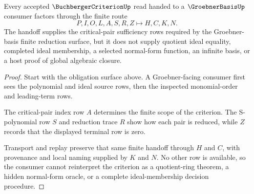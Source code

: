 \begin{theorem}
\label{thm:buchberger-criterion-groebner-handoff}
Every accepted $\BuchbergerCriterionUp$ read handed to a $\GroebnerBasisUp$ consumer factors through the finite route
$$
P,I,O,L,A,S,R,Z \longmapsto H,C,K,N .
$$
The handoff supplies the critical-pair sufficiency rows required by the Groebner-basis finite reduction surface, but it does not supply quotient ideal equality, completed ideal membership, a selected normal-form function, an infinite basis, or a host proof of global algebraic closure.
\end{theorem}
\begin{proof}
Start with the obligation surface above. A Groebner-facing consumer first sees the polynomial and ideal source rows, then the inspected monomial-order and leading-term rows.

The critical-pair index row $A$ determines the finite scope of the criterion. The S-polynomial row $S$ and reduction trace $R$ show how each pair is reduced, while $Z$ records that the displayed terminal row is zero.

Transport and replay preserve that same finite handoff through $H$ and $C$, with provenance and local naming supplied by $K$ and $N$. No other row is available, so the consumer cannot reinterpret the criterion as a quotient-ring theorem, a hidden normal-form oracle, or a complete ideal-membership decision procedure.
\end{proof}




